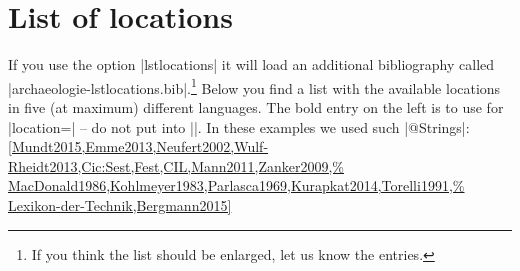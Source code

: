 \documentclass[a4paper,
10pt,
greek,
french,
spanish,
italian,
ngerman,
english
]{ltxdoc}
\begin{document}
\section{List of locations}\label{list-locations}
If you use the option |lstlocations| it will load an additional bibliography called |archaeologie-lstlocations.bib|.\footnote{If you think the list should be enlarged, let us know the entries.} 
Below you find a list with the available locations in five (at maximum) different languages.
The bold entry on the left is to use for |location=| -- do not put  into |{}|.
In these examples we used such |@Strings|:
\cref{Mundt2015,Emme2013,Neufert2002,Wulf-Rheidt2013,Cic:Sest,Fest,CIL,Mann2011,Zanker2009,%
MacDonald1986,Kohlmeyer1983,Parlasca1969,Kurapkat2014,Torelli1991,%
Lexikon-der-Technik,Bergmann2015}
\end{document}
